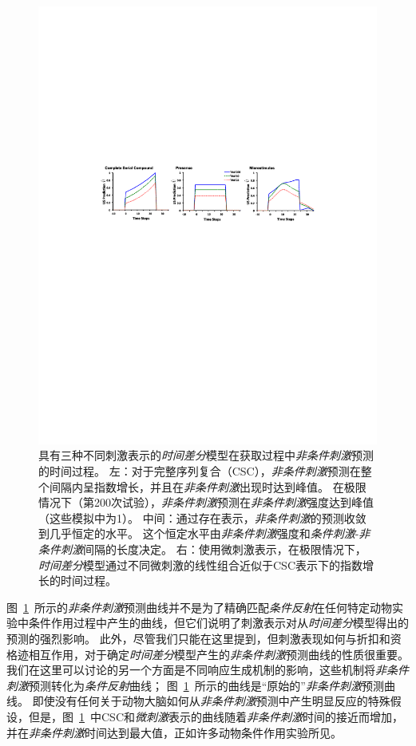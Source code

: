 \begin{figure}[!htb]
	\centering
	\includegraphics[width=0.8\linewidth]{chap11/fig_11_6}
	\caption{具有三种不同刺激表示的\textit{时间差分}模型在获取过程中\textit{非条件刺激}预测的时间过程。
		左：对于完整序列复合（CSC），\textit{非条件刺激}预测在整个间隔内呈指数增长，并且在\textit{非条件刺激}出现时达到峰值。
		在极限情况下（第200次试验），\textit{非条件刺激}预测在\textit{非条件刺激}强度达到峰值（这些模拟中为1）。
		中间：通过存在表示，\textit{非条件刺激}的预测收敛到几乎恒定的水平。
		这个恒定水平由\textit{非条件刺激}强度和\textit{条件刺激}-\textit{非条件刺激}间隔的长度决定。
		右：使用微刺激表示，在极限情况下，\textit{时间差分}模型通过不同微刺激的线性组合近似于CSC表示下的指数增长的时间过程。\label{fig:11_6}}
\end{figure}


图~\ref{fig:11_6}~所示的\textit{非条件刺激}预测曲线并不是为了精确匹配\textit{条件反射}在任何特定动物实验中条件作用过程中产生的曲线，但它们说明了刺激表示对从\textit{时间差分}模型得出的预测的强烈影响。
此外，尽管我们只能在这里提到，但刺激表现如何与折扣和资格迹相互作用，对于确定\textit{时间差分}模型产生的\textit{非条件刺激}预测曲线的性质很重要。
我们在这里可以讨论的另一个方面是不同响应生成机制的影响，这些机制将\textit{非条件刺激}预测转化为\textit{条件反射}曲线；
图~\ref{fig:11_6}~所示的曲线是“原始的”\textit{非条件刺激}预测曲线。
即使没有任何关于动物大脑如何从\textit{非条件刺激}预测中产生明显反应的特殊假设，但是，图~\ref{fig:11_6}~中CSC和\textit{微刺激}表示的曲线随着\textit{非条件刺激}时间的接近而增加，并在\textit{非条件刺激}时间达到最大值，正如许多动物条件作用实验所见。


